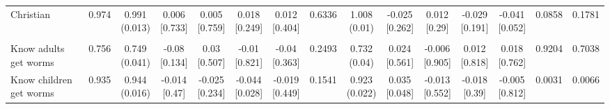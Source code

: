 {\begin{tabular}[t]{lcccccccccccccc}
\hspace{1em}Christian & 0.974 & \makecell[c]{0.991\\(0.013)} & \makecell[c]{0.006\\{[0.733]}} & \makecell[c]{0.005\\{[0.759]}} & \makecell[c]{0.018\\{[0.249]}} & \makecell[c]{0.012\\{[0.404]}} & 0.6336 & \makecell[c]{1.008\\(0.01)} & \makecell[c]{-0.025\\{[0.262]}} & \makecell[c]{0.012\\{[0.29]}} & \makecell[c]{-0.029\\{[0.191]}} & \makecell[c]{-0.041\\{[0.052]}} & 0.0858 & 0.1781\\
\addlinespace[0.3em]
\hline
\multicolumn{15}{l}{\textit{\textbf{Panel C: Deworming knowledge, $N=2,407$}}}\\
\hline
\hspace{1em}Know adults get worms & 0.756 & \makecell[c]{0.749\\(0.041)} & \makecell[c]{-0.08\\{[0.134]}} & \makecell[c]{0.03\\{[0.507]}} & \makecell[c]{-0.01\\{[0.821]}} & \makecell[c]{-0.04\\{[0.363]}} & 0.2493 & \makecell[c]{0.732\\(0.04)} & \makecell[c]{0.024\\{[0.561]}} & \makecell[c]{-0.006\\{[0.905]}} & \makecell[c]{0.012\\{[0.818]}} & \makecell[c]{0.018\\{[0.762]}} & 0.9204 & 0.7038\\
\hspace{1em}Know children get worms & 0.935 & \makecell[c]{0.944\\(0.016)} & \makecell[c]{-0.014\\{[0.47]}} & \makecell[c]{-0.025\\{[0.234]}} & \makecell[c]{-0.044\\{[0.028]}} & \makecell[c]{-0.019\\{[0.449]}} & 0.1541 & \makecell[c]{0.923\\(0.022)} & \makecell[c]{0.035\\{[0.048]}} & \makecell[c]{-0.013\\{[0.552]}} & \makecell[c]{-0.018\\{[0.39]}} & \makecell[c]{-0.005\\{[0.812]}} & 0.0031 & 0.0066\\

\end{tabular}}
